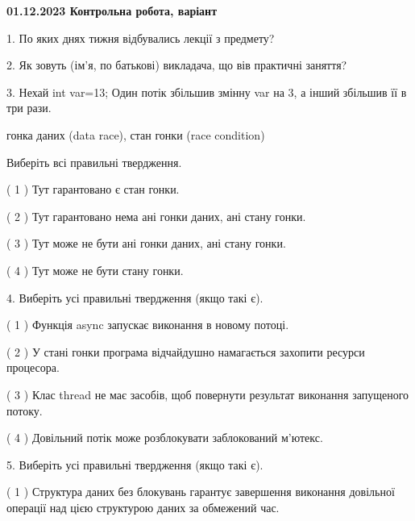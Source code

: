 \documentclass[12pt, ukrainian]{article}
\begin{document}
\vspace{4mm}
\newpage
\begin {large}

\textbf{01.12.2023 Контрольна робота, варіант  }\par


{
1. По яких днях тижня відбувались лекції з предмету?



\vspace{5mm}
2. Як зовуть (ім'я, по батькові) викладача, що вів практичні заняття?



\vspace{5mm}
3. Нехай int var=13; Один потік збільшив змінну var на 3, а інший збільшив її в три рази.

гонка даних (data race), стан гонки (race condition)

Виберіть всі правильні твердження.\par
\vspace{2mm}
( 1 ) Тут гарантовано є стан гонки.%

( 2 ) Тут гарантовано нема ані гонки даних, ані стану гонки.%

( 3 ) Тут може не бути ані гонки даних, ані стану гонки.%

( 4 ) Тут може не бути стану гонки.%


\vspace{5mm}
4. Виберіть усі правильні твердження (якщо такі є).\par
\vspace{2mm}

( 1 ) Функція async запускає виконання в новому потоці.%

( 2 ) У стані гонки програма відчайдушно намагається захопити ресурси процесора.%

( 3 ) Клас thread не має засобів, щоб повернути результат виконання запущеного потоку.%

( 4 ) Довільний потік може розблокувати заблокований м’ютекс.%


\vspace{5mm}
5. Виберіть усі правильні твердження (якщо такі є).\par
\vspace{2mm}

( 1 ) Структура даних без блокувань гарантує завершення виконання довільної операції над цією структурою даних за обмежений час.%

}
\end{large}
\end{document}
